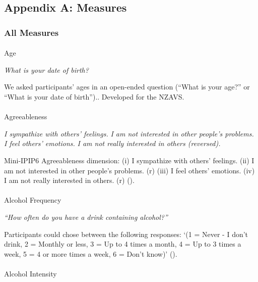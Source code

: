 \documentclass[
  single column]{article}
\makeatletter
\let\oldparagraph\paragraph
\renewcommand{\paragraph}{
    \@ifstar
      \xxxParagraphStar
      \xxxParagraphNoStar
  }
\newcommand{\xxxParagraphStar}[1]{\oldparagraph*{#1}\mbox{}}
\newcommand{\xxxParagraphNoStar}[1]{\oldparagraph{#1}\mbox{}}
\makeatother
\begin{document}
\subsection{Appendix A: Measures}\label{appendix-measures}

\subsubsection{All Measures}\label{all-measures}

\paragraph{Age}\label{age}

\emph{What is your date of birth?}

We asked participants' ages in an open-ended question (``What is your
age?'' or ``What is your date of birth'').. Developed for the NZAVS.

\paragraph{Agreeableness}\label{agreeableness}

\emph{I sympathize with others' feelings.} \emph{I am not interested in
other people's problems.} \emph{I feel others' emotions.} \emph{I am not
really interested in others (reversed).}

Mini-IPIP6 Agreeableness dimension: (i) I sympathize with others'
feelings. (ii) I am not interested in other people's problems. (r) (iii)
I feel others' emotions. (iv) I am not really interested in others. (r)
().

\paragraph{Alcohol Frequency}\label{alcohol-frequency}

\emph{``How often do you have a drink containing alcohol?''}

Participants could chose between the following responses: `(1 = Never -
I don't drink, 2 = Monthly or less, 3 = Up to 4 times a month, 4 = Up to
3 times a week, 5 = 4 or more times a week, 6 = Don't know)'
().

\paragraph{Alcohol Intensity}\label{alcohol-intensity}
\end{document}
